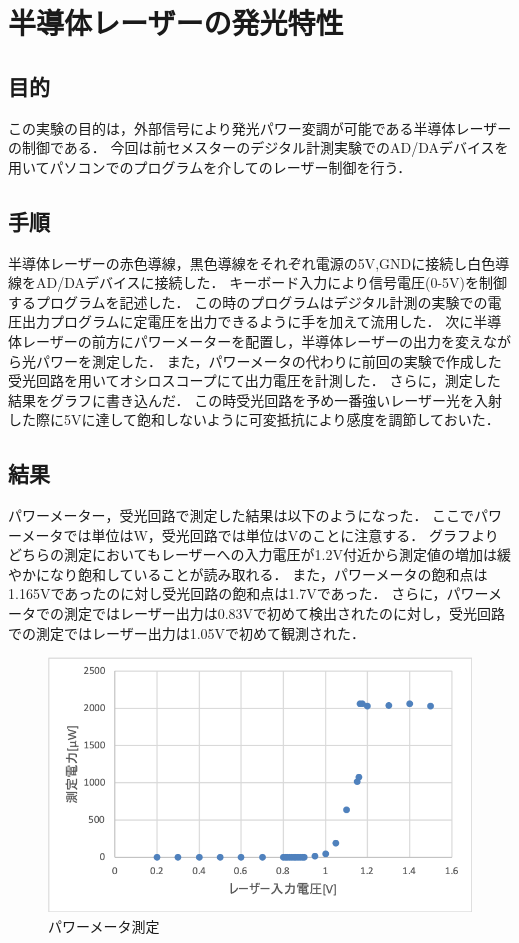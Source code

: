 \documentclass[11pt, a4paper,twocolumn]{jarticle}
\begin{document}
\section{半導体レーザーの発光特性}
\subsection{目的}
この実験の目的は，外部信号により発光パワー変調が可能である半導体レーザーの制御である．
今回は前セメスターのデジタル計測実験でのAD/DAデバイスを用いてパソコンでのプログラムを介してのレーザー制御を行う．
\subsection{手順}
半導体レーザーの赤色導線，黒色導線をそれぞれ電源の5V,GNDに接続し白色導線をAD/DAデバイスに接続した．
キーボード入力により信号電圧(0-5V)を制御するプログラムを記述した．
この時のプログラムはデジタル計測の実験での電圧出力プログラムに定電圧を出力できるように手を加えて流用した．
次に半導体レーザーの前方にパワーメーターを配置し，半導体レーザーの出力を変えながら光パワーを測定した．
また，パワーメータの代わりに前回の実験で作成した受光回路を用いてオシロスコープにて出力電圧を計測した．
さらに，測定した結果をグラフに書き込んだ．
この時受光回路を予め一番強いレーザー光を入射した際に5Vに達して飽和しないように可変抵抗により感度を調節しておいた．

\subsection{結果}
パワーメーター，受光回路で測定した結果は以下のようになった．
ここでパワーメータでは単位はW，受光回路では単位はVのことに注意する．
グラフよりどちらの測定においてもレーザーへの入力電圧が1.2V付近から測定値の増加は緩やかになり飽和していることが読み取れる．
また，パワーメータの飽和点は1.165Vであったのに対し受光回路の飽和点は1.7Vであった．
さらに，パワーメータでの測定ではレーザー出力は0.83Vで初めて検出されたのに対し，受光回路での測定ではレーザー出力は1.05Vで初めて観測された．

\begin{figure}[ht]
 \begin{center}
  \includegraphics[width=0.8\linewidth]{fig2.png}
 \end{center}
 \caption{パワーメータ測定}
 \label{fig:2}
\end{figure}
\end{document}
